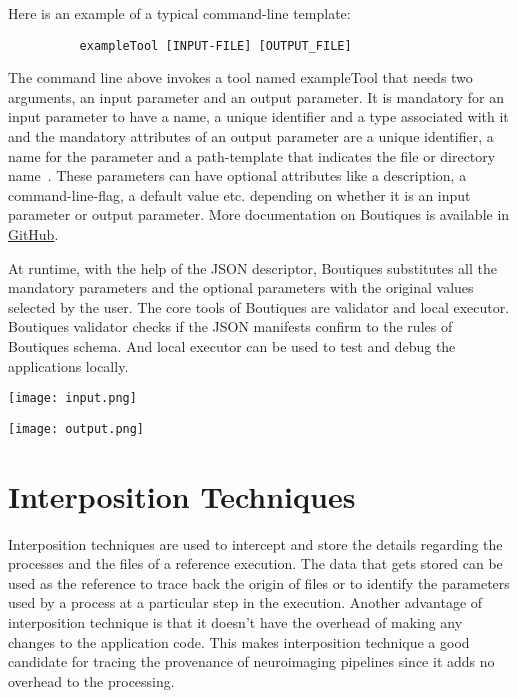 
Here is an example of a typical command-line template:

\begin{verbatim}
          exampleTool [INPUT-FILE] [OUTPUT_FILE]
\end{verbatim}

The command line above invokes a tool named exampleTool that needs two arguments, an input parameter and an output parameter. It is mandatory for an input parameter to have a name, a unique identifier and a type associated with it and the mandatory attributes of an output parameter are a unique identifier, a name for the parameter and a path-template that indicates the file or directory name~\cite{boutiques}. These parameters can have optional attributes like a description, a command-line-flag, a default value etc. depending on whether it is an input parameter or output parameter. More documentation on Boutiques is available in \href{https://github.com/boutiques/boutiques/blob/master/examples/Getting\%20Started\%20with\%20Boutiques.ipynb}{GitHub}.

At runtime, with the help of the JSON descriptor, Boutiques substitutes all the mandatory parameters and the optional parameters with the original values selected by the user. The core tools of Boutiques are validator and local executor. Boutiques validator checks if the JSON manifests confirm to the rules of Boutiques schema. And local executor can be used to test and debug the applications locally.

\begin{center}
\texttt{[image: input.png]}
\label{fig:input}
\end{center}

\begin{center}
\texttt{[image: output.png]}
\label{fig:output}
\end{center}

\section{Interposition Techniques}\label{Interposition}
Interposition techniques are used to intercept and store the details regarding the processes and the files of a reference execution. 
The data that gets stored can be used as the reference to trace back the origin of files or to identify the parameters used by a process at a particular step in the execution. 
Another advantage of interposition technique is that it doesn't have the overhead of making any changes to the application code. 
This makes interposition technique a good candidate for tracing the provenance of neuroimaging pipelines since it adds no overhead to the processing.

